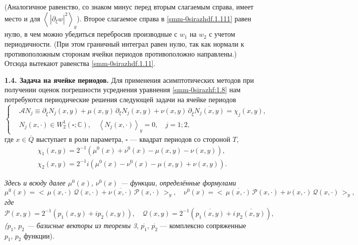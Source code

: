 \documentclass[a4paper,12pt]{article}
\theoremstyle{definition}
\begin{document}
(Аналогичное равенство, со знаком минус перед вторым слагаемым справа, имеет место и для $\left<\,|\partial_{\xi} w|^2\right>_y$). Второе слагаемое справа в \eqref{smm-0sirazhdf.1.111} равен нулю, в чем можно убедиться перебросив производные с
$w_1$ на $w_2$ с учетом периодичности. (При этом граничный интеграл равен нулю, так как нормали к противоположным
сторонам ячейки периодов противоположно направлены.) Отсюда вытекают равенства \eqref{smm-0sirazhdf.1.11}.


\smallskip
\textbf{1.4. Задача на ячейке периодов.}
Для применения асимптотических методов при получении оценок погрешности усреднения
уравнения \eqref{smm-0sirazhf:1.8} нам потребуются периодические
решения следующей задачи на ячейке периодов
\begin{equation}\label{smm-0sirazhf:1.11}
	\left\{\begin{aligned}
		&\mathcal{A}N_j\equiv \partial_{\bar\xi}N_j(x,y)+\mu(x,y)\,\partial_\xi N_j(x,y)+\nu(x,y)\,
		\partial_{\bar\xi}\overline{N_j(x,y)}=\chi_j(x,y),\\
		& N_j(x,\cdot)\in W_2^{1}(\square;\mathbb{C}),\quad \left<N_j(x,\cdot)\right>_y=0,\quad j=1;2,
	\end{aligned}\right.
\end{equation}
где $x\in \overline Q$ выступает в роли параметра, $\square$ --- квадрат периодов со стороной $T$,
\begin{equation}\label{smm-0sirazhdf:1}
	\begin{aligned}
		&\chi_1(x,y)=2^{-1}\left(\mu^0(x)+\nu^0(x)-\mu(x,y)-\nu(x,y)\right),\\
		&\chi_2(x,y)=2^{-1}i\left(\mu^0(x)-\nu^0(x)-\mu(x,y)+\nu(x,y)\right).
	\end{aligned}
\end{equation}

\textit{Здесь и всюду далее  $\mu^0(x)$, $\nu^0(x)$ --- функции, определённые
	формулами}
\begin{equation}\label{smm-0sirazhdf:1.11}
	\mu^0(x)=\big<\,\mu(x,\cdot)\, \mathscr Q(x,\cdot)+\overline{\nu(x,\cdot)}\,\mathscr{P}(x,\cdot)\,\big>_y, \quad
	\nu^0(x)=\big<\,\overline{\mu(x,\cdot)}\,\mathscr{P}(x,\cdot)+\nu(x,\cdot)\, \mathscr Q(x,\cdot)\,\big>_y,
\end{equation}
\textit{где}
$
\mathscr{P}(x,y)=2^{-1}(p_1(x,y)+ip_2(x,y)),
\quad \mathscr Q(x,y)=2^{-1}(\overline{p_1(x,y)}+i\,\overline{p_2(x,y)}),
$
\textit{{\rm(}$p_1$, $p_2$ ---  базисные векторы из теоремы {\rm 3}},
$\overline{p_1}$, $\overline{p_2}$ --- комплексно сопряженные $p_1$, $p_2$
функции{\rm)}.
\end{document}
